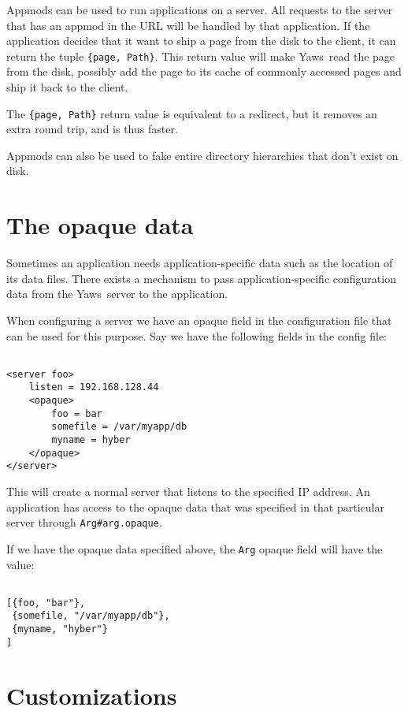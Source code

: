\documentclass[11pt,oneside,english]{book}
\newcommand{\Yaws}            %
        {{\sc Yaws}}
\begin{document}
Appmods can be used to run applications on a server. All requests
to the server that has an appmod in the URL will be handled by that
application. If the application decides that it want to
ship a page from the disk to the client, it can return the
tuple \verb+{page, Path}+. This return value will make \Yaws\  read
the page from the disk, possibly add the page to its cache of
commonly accessed pages and ship it back to the client.

The \verb+{page, Path}+ return value is equivalent to a
redirect, but it removes an extra round trip, and is thus faster.

Appmods can also be used to fake entire directory hierarchies
that don't exist on disk.


\section{The opaque data}

Sometimes an application needs application-specific data such as the
location of its data files. There exists a mechanism to pass
application-specific configuration data from the \Yaws\ server to the
application.

When configuring a server we have an opaque field in the configuration
file that can be used for this purpose.  Say we have the following
fields in the config file:

\begin{verbatim}

<server foo>
    listen = 192.168.128.44
    <opaque>
        foo = bar
        somefile = /var/myapp/db
        myname = hyber
    </opaque>
</server>
\end{verbatim}

This will create a normal server that listens to the specified IP address.
An application has access to the opaque data that was specified
in that particular server through \verb+Arg#arg.opaque+.

If we have the opaque data specified above, the \verb+Arg+ opaque
field will have the value:

\begin{verbatim}

[{foo, "bar"},
 {somefile, "/var/myapp/db"},
 {myname, "hyber"}
]

\end{verbatim}


\section{Customizations}
\end{document}

